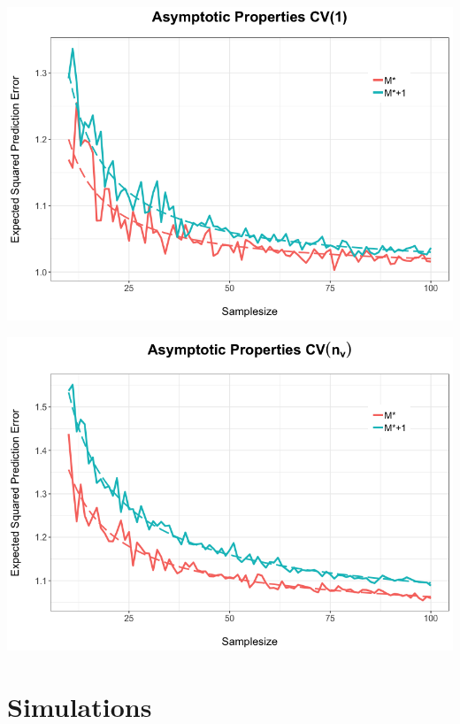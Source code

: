 \documentclass[20pt,mathserif,xcolor=dvipsnames]{beamer}
\begin{document}
\begin{frame}
\centering
\includegraphics[width=1.2\textheight]{ProofSketchCV(1).png}
\end{frame}

\begin{frame}
\centering
\includegraphics[width=1.2\textheight]{ProofSketchCV(n_v).png}
\end{frame}

\thispagestyle{empty}
\section{Simulations}
\end{document}
